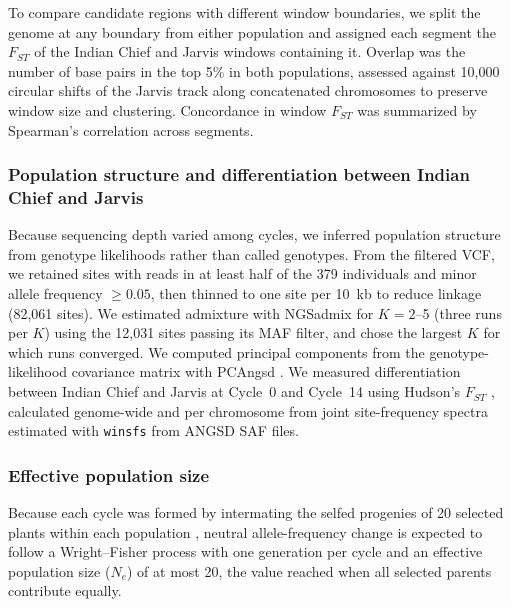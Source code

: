 To compare candidate regions with different window boundaries, we split the genome at any boundary from either population and assigned each segment the $F_{ST}$ of the Indian Chief and Jarvis windows containing it. Overlap was the number of base pairs in the top 5\% in both populations, assessed against 10,000 circular shifts of the Jarvis track along concatenated chromosomes to preserve window size and clustering. Concordance in window $F_{ST}$ was summarized by Spearman’s correlation across segments.

\subsubsection{Population structure and differentiation between Indian Chief and Jarvis}

Because sequencing depth varied among cycles, we inferred population structure from genotype likelihoods rather than called genotypes. From the filtered VCF, we retained sites with reads in at least half of the 379 individuals and minor allele frequency $\ge 0.05$, then thinned to one site per 10~kb to reduce linkage (82,061 sites). We estimated admixture with NGSadmix \citep{Skotte2013NGSadmix} for $K=2$--5 (three runs per $K$) using the 12,031 sites passing its MAF filter, and chose the largest $K$ for which runs converged. We computed principal components from the genotype-likelihood covariance matrix with PCAngsd \citep{Meisner2018PCAngsd}. We measured differentiation between Indian Chief and Jarvis at Cycle~0 and Cycle~14 using Hudson's $F_{ST}$ \citep{Bhatia2013Fst}, calculated genome-wide and per chromosome from joint site-frequency spectra estimated with \texttt{winsfs} \citep{Rasmussen2022winsfs} from ANGSD SAF files.

\subsubsection{Effective population size}
Because each cycle was formed by intermating the selfed progenies of 20 selected plants within each population \citep{MollStuber1971}, neutral allele-frequency change is expected to follow a Wright--Fisher process with one generation per cycle and an effective population size ($N_e$) of at most 20, the value reached when all selected parents contribute equally.

